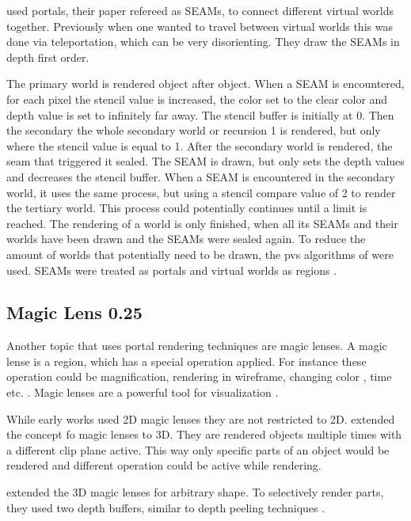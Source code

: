 \textcite{schmalstieg:1999:sewing} used portals, their paper refereed as SEAMs, to connect different virtual worlds together. Previously when one wanted to travel between virtual worlds this was done via teleportation, which can be very disorienting. They draw the SEAMs in depth first order.

The primary world is rendered object after object. When a SEAM is encountered, for each pixel  the stencil value is increased, the color set to the clear color and  depth value is set to infinitely far away. The stencil buffer is initially at 0. Then the secondary the whole secondary world or recursion 1 is rendered, but only where the stencil value is equal to 1. After the secondary world is rendered, the seam that triggered it sealed. The SEAM is drawn, but only sets the depth values and decreases the stencil buffer. When a SEAM is encountered in the secondary world, it uses the same process, but using a stencil compare value of 2 to render the tertiary world. This process could potentially continues until a limit is reached. The rendering of a world is only finished, when all its SEAMs and their worlds have been drawn and the SEAMs were sealed again. To reduce the amount of worlds that potentially need to be drawn,  the \gls{pvs} algorithms of \textcite{luebke:1995:portals} were used. SEAMs were treated as portals and virtual worlds as regions \cite{schmalstieg:1999:sewing}.

\subsection{Magic Lens 0.25}
Another topic that uses portal rendering techniques are magic lenses. A magic lense is a region, which has a special operation applied. For instance these operation could be magnification, rendering in wireframe, changing color \cite{bier:1993:toolglass}, time \cite{ryall:2005:temporal, tiesel:2009:composable} etc. . Magic lenses are a powerful tool for visualization  \cite{bier:1993:toolglass, tominski:2014:survey}.

While early works used 2D magic lenses \cite{bier:1993:toolglass} they are not restricted to 2D. \textcite{viega:1996:3d} extended the concept fo magic lenses to 3D. They  are rendered objects multiple times with a different clip plane active. This way only specific parts of an object would be rendered and different operation could be active while rendering.

\textcite{ropinski:2004:real} extended the 3D magic lenses for arbitrary shape. To selectively render parts, they used two depth buffers, similar to depth peeling techniques \cite{everitt:2001:interactive}.


